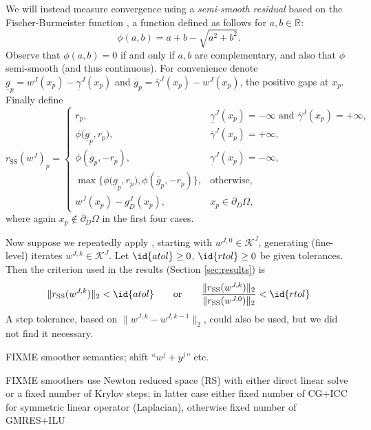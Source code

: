 \documentclass[letterpaper,final,12pt,reqno]{amsart}
\theoremstyle{cstyle}
\theoremstyle{cstyle*}
\theoremstyle{dstyle}
\numberwithin{equation}{section}
\numberwithin{figure}{section}
\numberwithin{table}{section}
\numberwithin{theorem}{section}
\newcommand{\RR}{\mathbb{R}}
\newcommand{\rSS}{r_{\text{SS}}}
\begin{document}
We will instead measure convergence using a \emph{semi-smooth residual} based on the Fischer-Burmeister function \cite{BensonMunson2006,Ulbrich2011}, a function defined as follows for $a,b\in\RR$:
\begin{equation}
\phi(a,b) = a + b - \sqrt{a^2 + b^2}. \label{eq:phiFB}
\end{equation}
Observe that $\phi(a,b)=0$ if and only if $a,b$ are complementary, and also that $\phi$ semi-smooth (and thus continuous).  For convenience denote $\underline{g}_p = w^J(x_p) - \underline{\gamma}^J(x_p)$ and $\overline{g}_p = \overline{\gamma}^J(x_p) - w^J(x_p)$, the positive gaps at $x_p$.  Finally define
\begin{equation}
\rSS(w^J)_p = \begin{cases}
r_p, & \underline{\gamma}^J(x_p) = -\infty \text{ and } \overline{\gamma}^J(x_p) = +\infty, \\
\phi\big(\underline{g}_p, r_p\big), & \overline{\gamma}^J(x_p) = +\infty, \\
\phi\left(\overline{g}_p, -r_p\right), & \underline{\gamma}^J(x_p) = -\infty, \\
\max\big\{\phi\big(\underline{g}_p, r_p\big), \phi\left(\overline{g}_p, -r_p\right)\big\}, & \text{otherwise}, \\
w^J(x_p) - g_D^J(x_p), & x_p \in \partial_D\Omega,
\end{cases} \label{eq:rSS}
\end{equation}
where again $x_p \notin \partial_D\Omega$ in the first four cases.

Now suppose we repeatedly apply , starting with $w^{J,0} \in \mathcal{K}^J$, generating (fine-level) iterates $w^{J,k} \in \mathcal{K}^J$.  Let $\id{atol}\ge 0$, $\id{rtol}\ge 0$ be given tolerances.  Then the criterion used in the results (Section \ref{sec:results}) is 
\begin{equation}
\|\rSS(w^{J,k})\|_2 < \id{atol} \qquad \text{or} \qquad \frac{\|\rSS(w^{J,k})\|_2}{\|\rSS(w^{J,0})\|_2} < \id{rtol} \label{eq:stoppingcriterion}
\end{equation}
A step tolerance, based on $\|w^{J,k} - w^{J,k-1}\|_2$, could also be used, but we did not find it necessary.

FIXME smoother semantics; shift ``$w^j+y^j$'' etc.

FIXME smoothers use Newton reduced space (RS) \cite{BensonMunson2006}with either direct linear solve or a fixed number of Krylov steps; in latter case either fixed number of CG+ICC for symmetric linear operator (Laplacian), otherwise fixed number of GMRES+ILU
\end{document}
